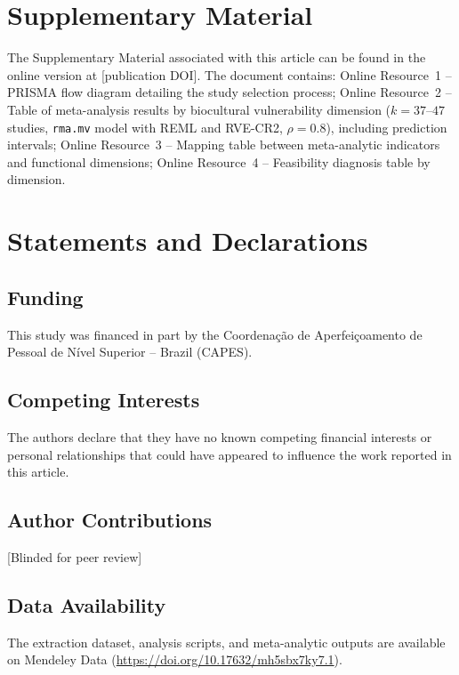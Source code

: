 \documentclass[12pt,a4paper]{article}
\begin{document}
\section*{Supplementary Material}

The Supplementary Material associated with this article can be found in the online version at [publication DOI]. The document contains: Online Resource~1 -- PRISMA flow diagram detailing the study selection process; Online Resource~2 -- Table of meta-analysis results by biocultural vulnerability dimension ($k = 37$--$47$ studies, \texttt{rma.mv} model with REML and RVE-CR2, $\rho = 0.8$), including prediction intervals; Online Resource~3 -- Mapping table between meta-analytic indicators and functional dimensions; Online Resource~4 -- Feasibility diagnosis table by dimension.




\section*{Statements and Declarations}

\subsection*{Funding}

This study was financed in part by the Coordena\c{c}\~ao de Aperfei\c{c}oamento de Pessoal de N\'ivel Superior -- Brazil (CAPES).

\subsection*{Competing Interests}

The authors declare that they have no known competing financial interests or personal relationships that could have appeared to influence the work reported in this article.

\subsection*{Author Contributions}

[Blinded for peer review]

\subsection*{Data Availability}

The extraction dataset, analysis scripts, and meta-analytic outputs are available on Mendeley Data (\url{https://doi.org/10.17632/mh5sbx7ky7.1}).
\end{document}
